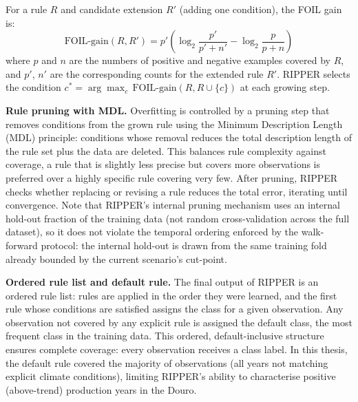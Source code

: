 For a rule $R$ and candidate extension $R'$ (adding one condition), the FOIL gain is:
\begin{equation}
  \text{FOIL-gain}(R, R') = p' \left(\log_2\frac{p'}{p'+n'} - \log_2\frac{p}{p+n}\right)
  \label{eq:foil}
\end{equation}
where $p$ and $n$ are the numbers of positive and negative examples covered by $R$, and $p'$, $n'$ are the corresponding counts for the extended rule $R'$. RIPPER selects the condition $c^* = \arg\max_c \,\text{FOIL-gain}(R, R \cup \{c\})$ at each growing step.

\textbf{Rule pruning with MDL. }Overfitting is controlled by a pruning step that removes conditions from the grown rule using the Minimum Description Length (MDL) principle: conditions whose removal reduces the total description length of the rule set plus the data are deleted. This balances rule complexity against coverage, a rule that is slightly less precise but covers more observations is preferred over a highly specific rule covering very few. After pruning, RIPPER checks whether replacing or revising a rule reduces the total error, iterating until convergence. Note that RIPPER's internal pruning mechanism uses an internal hold-out fraction of the training data (not random cross-validation across the full dataset), so it does not violate the temporal ordering enforced by the walk-forward protocol: the internal hold-out is drawn from the same training fold already bounded by the current scenario's cut-point.

\textbf{Ordered rule list and default rule. }The final output of RIPPER is an ordered rule list: rules are applied in the order they were learned, and the first rule whose conditions are satisfied assigns the class for a given observation. Any observation not covered by any explicit rule is assigned the default class, the most frequent class in the training data. This ordered, default-inclusive structure ensures complete coverage: every observation receives a class label. In this thesis, the default rule covered the majority of observations (all years not matching explicit climate conditions), limiting RIPPER's ability to characterise positive (above-trend) production years in the Douro.

